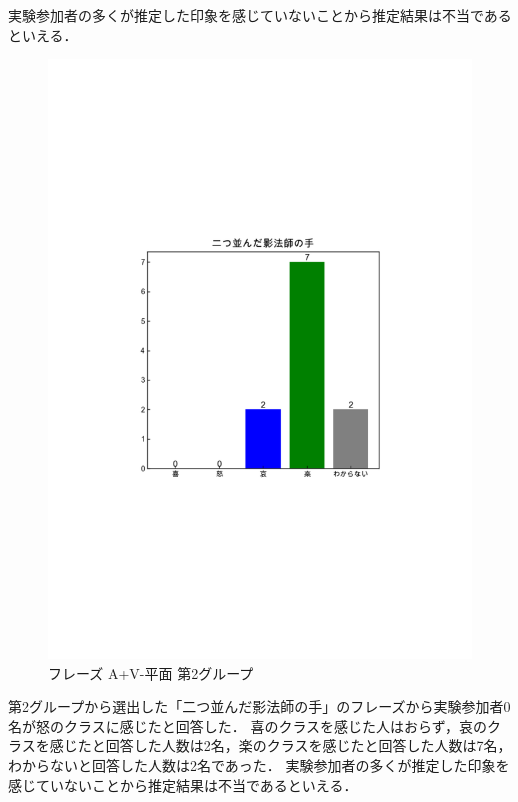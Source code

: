 実験参加者の多くが推定した印象を感じていないことから推定結果は不当であるといえる．
\newpage
\begin{figure}[H]
    \centering
    \includegraphics[width=14cm]{435.pdf}
    \vspace{-1mm}
    \caption{フレーズ A+V-平面 第2グループ}
    \label{fig:mms}
    \vspace{5mm}
\end{figure}
第2グループから選出した「二つ並んだ影法師の手」のフレーズから実験参加者0名が怒のクラスに感じたと回答した．
喜のクラスを感じた人はおらず，哀のクラスを感じたと回答した人数は2名，楽のクラスを感じたと回答した人数は7名，わからないと回答した人数は2名であった．
実験参加者の多くが推定した印象を感じていないことから推定結果は不当であるといえる．
\newpage
